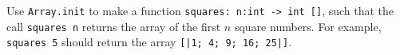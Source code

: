 Use \lstinline{Array.init} to make a function \lstinline{squares: n:int -> int []}, such that the call \lstinline{squares n} returns the array of the first $n$ square numbers. For example, \lstinline{squares 5} should return the array \lstinline{[|1; 4; 9; 16; 25|]}.
